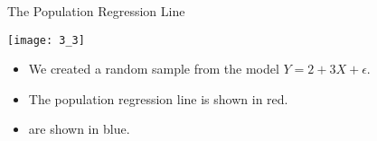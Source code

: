 \documentclass[mathserif, aspectratio=169]{beamer}
\begin{document}
\begin{frame}{The Population Regression Line}
	\begin{center}
		\texttt{[image: 3\_3]}
	\end{center}
	\vspace{-5mm}
	\begin{itemize}
		\item We created a random sample from the model $Y = 2 + 3 X + \epsilon$.
		\item The population regression line is shown in red.
		\item {} are shown in blue.
	\end{itemize}
\end{frame}
\end{document}

